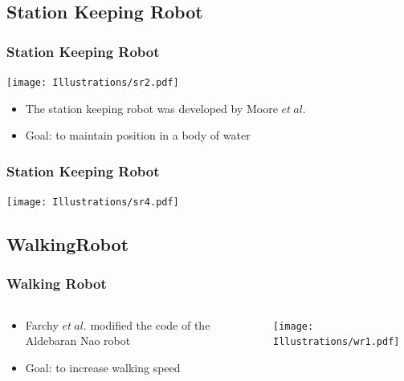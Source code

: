\documentclass{beamer}
\begin{document}
\subsection{Station Keeping Robot}
\begin{frame}
  \frametitle{Station Keeping Robot}
\begin{center}
 \texttt{[image: Illustrations/sr2.pdf]}
       \\
\end{center}
\begin{itemize}
\item \large The station keeping robot was developed by Moore $et~al.$ 
\item \large Goal: to maintain position in a body of water
\end{itemize}
\end{frame}

\begin{frame}
  \frametitle{Station Keeping Robot}
\begin{center}
 \texttt{[image: Illustrations/sr4.pdf]}
       \\
\end{center}

\end{frame}

\subsection{WalkingRobot}
\begin{frame}
  \frametitle{Walking Robot}

\begin{columns}
  \begin{column}{0.5\textwidth}
\begin{itemize}
\item  Farchy $et~al.$ modified the code of the Aldebaran Nao robot
\item Goal: to increase walking speed
\end{itemize}
\end{column}
\begin{column}{0.5\textwidth}
 \texttt{[image: Illustrations/wr1.pdf]}
       \\
\end{column}
\end{columns}
\end{frame}
\end{document}
